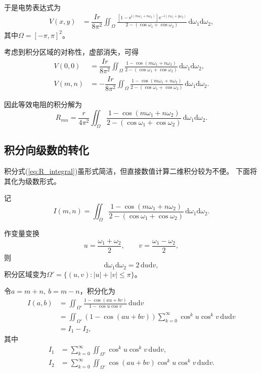\documentclass{article} %
\newcommand{\di}{\mathrm{d}}
\newcommand{\ii}{\mathrm{i}}
\newcommand{\e}[1]{\mathrm{e}^{#1}}
\begin{document}
于是电势表达式为
\begin{align}
  V(x,y)&=\dfrac{Ir}{8\pi^2}
  \iint_{\Omega}\frac{\left[1-\e{\ii(m\omega_1+n\omega_2)}\right]
  \e{-\ii(x\omega_1+y\omega_2)}}
  {2-(\cos\omega_1+\cos\omega_2)}\,\di\omega_1\di\omega_2,
\end{align}
其中$\Omega=[-\pi,\pi]^2$。

考虑到积分区域的对称性，虚部消失，可得
\begin{align}
  V(0,0)&=\dfrac{Ir}{8\pi^2}
  \iint_{\Omega}\frac{1-\cos(m\omega_1+n\omega_2)}
  {2-(\cos\omega_1+\cos\omega_2)}\,\di\omega_1\di\omega_2,\\
  V(m,n)&=-\dfrac{Ir}{8\pi^2}
  \iint_{\Omega}\frac{1-\cos(m\omega_1+n\omega_2)}
  {2-(\cos\omega_1+\cos\omega_2)}\,\di\omega_1\di\omega_2.
\end{align}

因此等效电阻的积分解为
\begin{equation}
  R_{mn}=\dfrac{r}{4\pi^2}
  \iint_{\Omega}\frac{1-\cos(m\omega_1+n\omega_2)}
  {2-(\cos\omega_1+\cos\omega_2)}\,\di\omega_1\di\omega_2.
\label{eq:R_integral}
\end{equation}

\subsection{积分向级数的转化}

积分式(\ref{eq:R_integral})虽形式简洁，但直接数值计算二维积分较为不便。
下面将其化为级数形式。

记
\begin{equation}
  I(m,n)=\iint_{\Omega}\frac{1-\cos(m\omega_1+n\omega_2)}
  {2-(\cos\omega_1+\cos\omega_2)}\,\di\omega_1\di\omega_2.
\end{equation}

作变量变换
\begin{equation}
  u=\frac{\omega_1+\omega_2}{2},\qquad v=\frac{\omega_1-\omega_2}{2},
\end{equation}
则
\begin{equation}
  \di\omega_1\di\omega_2=2\,\di u\di v,
\end{equation}
积分区域变为$\Omega'=\{(u,v): |u|+|v|\leqslant \pi\}$。

令$a=m+n,\ b=m-n$，积分化为
\begin{align}
  I(a,b)&=\iint_{\Omega'}\frac{1-\cos(au+bv)}{1-\cos u\cos v}\,\di u\di v\nonumber\\
  &=\iint_{\Omega'}(1-\cos(au+bv))
  \sum_{k=0}^{\infty}\cos^k u\cos^k v\,\di u\di v\nonumber\\
  &=I_1-I_2,
\end{align}
其中
\begin{align}
  I_1&=\sum_{k=0}^{\infty}\iint_{\Omega'}\cos^k u\cos^k v\,\di u\di v,\\
  I_2&=\sum_{k=0}^{\infty}\iint_{\Omega'}\cos(au+bv)\cos^k u\cos^k v\,\di u\di v.
\end{align}
\end{document}
